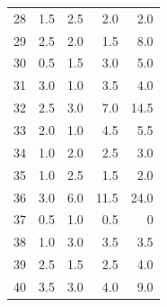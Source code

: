 \documentclass[
  letterpaper,
  DIV=11,
  numbers=noendperiod]{scrartcl}
\begin{document}
\begin{longtable}[]{@{}lrrrr@{}}
28 & 1.5 & 2.5 & 2.0 & 2.0 \\
29 & 2.5 & 2.0 & 1.5 & 8.0 \\
30 & 0.5 & 1.5 & 3.0 & 5.0 \\
31 & 3.0 & 1.0 & 3.5 & 4.0 \\
32 & 2.5 & 3.0 & 7.0 & 14.5 \\
33 & 2.0 & 1.0 & 4.5 & 5.5 \\
34 & 1.0 & 2.0 & 2.5 & 3.0 \\
35 & 1.0 & 2.5 & 1.5 & 2.0 \\
36 & 3.0 & 6.0 & 11.5 & 24.0 \\
37 & 0.5 & 1.0 & 0.5 & 0 \\
38 & 1.0 & 3.0 & 3.5 & 3.5 \\
39 & 2.5 & 1.5 & 2.5 & 4.0 \\
40 & 3.5 & 3.0 & 4.0 & 9.0 \\

\end{longtable}
\end{document}
